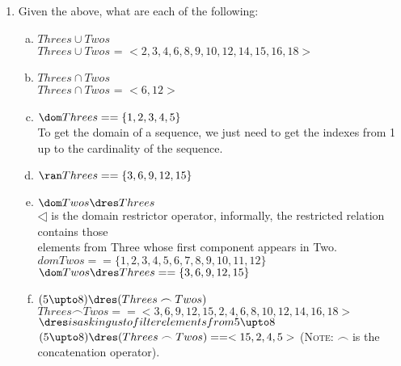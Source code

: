 \documentclass{article}
\begin{document}
\begin{enumerate}[\bf I.]
\begin{enumerate}[1.]
\item Given the above, what are each of the following:
\begin{enumerate}[a.]
\item $Threes \cup Twos$ \\
  $Threes \cup Twos$ = $<2,3,4,6,8,9,10,12,14,15,16,18 >$ \\
\item $Threes \cap Twos$ \\
  $Threes \cap Twos$ = $<6, 12>$ \\
\item $\dom Threes == \{1, 2 ,3 ,4 ,5 \}$ \\
  To get the domain of a sequence, we just need to get the indexes from 1 up to the cardinality of the sequence. \\
\item $\ran Threes == \{3 ,6 ,9 ,12 ,15\}$ \\
\item $\dom Twos \dres Threes$ \\
  $\dres$ is the domain restrictor operator, informally, the restricted relation contains those \\
  elements from Three whose first component appears in Two. \\
  $dom Twos == \{1,2,3,4,5,6,7,8,9,10,11,12\}$\\
  $\dom Twos \dres Threes == \{3, 6, 9, 12, 15\}$\\
\item $(5 \upto 8)\dres (Threes \frown Twos)$\\
  $Threes \frown Twos == <3,6,9,12,15,2,4,6,8,10,12,14,16,18>$
  $\dres is asking us to filter elements from 5 \upto 8$ \\
  $(5 \upto 8)\dres (Threes \frown Twos) == <15,2,4,5>$
(\textsc{Note}: $\frown$ is the concatenation operator).
\end{enumerate}
\end{enumerate}



\end{enumerate}
\end{document}
